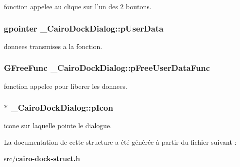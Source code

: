 fonction appelee au clique sur l'un des 2 boutons. 

\subsubsection{\setlength{\rightskip}{0pt plus 5cm}gpointer {\bf \_\-CairoDockDialog::pUserData}}\label{struct__CairoDockDialog_c5ddbbfbf00a1643f29982ffebf26338}


donnees transmises a la fonction. 

\subsubsection{\setlength{\rightskip}{0pt plus 5cm}GFreeFunc {\bf \_\-CairoDockDialog::pFreeUserDataFunc}}\label{struct__CairoDockDialog_b9b704f111739b7e5b58068eb54c3462}


fonction appelee pour liberer les donnees. 

\subsubsection{$\ast$ {\bf \_\-CairoDockDialog::pIcon}}\label{struct__CairoDockDialog_30b7523044fc0946002f9e299a2fc5c9}


icone sur laquelle pointe le dialogue. 



La documentation de cette structure a été générée à partir du fichier suivant :\begin{CompactItemize}
\item 
src/{\bf cairo-dock-struct.h}\end{CompactItemize}
